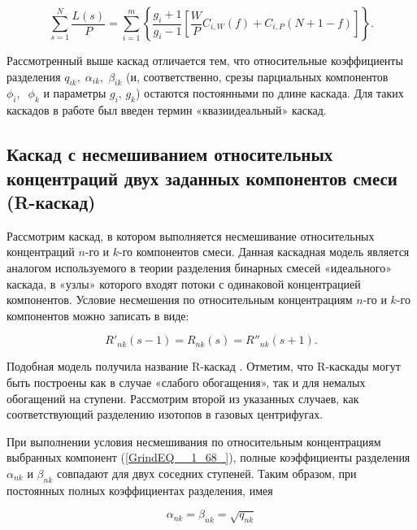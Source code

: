 \begin{equation} \label{GrindEQ__1_62_} 
  \sum _{s=1}^{N}\frac{L(s)}{P} =\sum _{i=1}^{m}\left\{\frac{g_{i} +1}{g_{i} -1} \left[\frac{W}{P} C_{i,W} (f)+C_{i,P} \left(N+1-f\right)\right]\right\}  .   
\end{equation} 
  
Рассмотренный выше каскад отличается тем, что относительные коэффициенты разделения $q_{ik} ,\; \alpha _{ik} ,\; \beta _{ik} $ (и, соответственно, срезы парциальных компонентов $\phi _{i} ,\; \; \phi _{k} $ и параметры $g_{i} $, $g_{k} $) остаются постоянными по длине каскада. Для таких каскадов в работе \cite{sazykinKvaziidealnyeKaskadyDlya2000} был введен термин «квазиидеальный» каскад.

\subsection{Каскад с несмешиванием относительных концентраций двух заданных компонентов смеси (R-каскад)}\label{R_cas}

Рассмотрим каскад, в котором выполняется несмешивание относительных концентраций $n$-го и $k$-го компонентов смеси. Данная каскадная модель является аналогом используемого в теории разделения бинарных смесей «идеального» каскада, в «узлы» которого входят потоки с одинаковой концентрацией компонентов. Условие несмешения по относительным концентрациям $n$-го и $k$-го компонентов можно записать в виде:

\begin{equation} \label{GrindEQ__1_68_} 
  R'_{nk} (s-1)=R_{nk} (s)=R''_{nk} (s+1).                                                 
\end{equation} 

Подобная модель получила название R-каскад \cite{sulaberidzeTeoriyaKaskadovDlya2011}. Отметим, что R-каскады могут быть построены как в случае «слабого обогащения», так и для немалых обогащений на ступени. Рассмотрим второй из указанных случаев, как соответствующий разделению изотопов в газовых центрифугах.

При выполнении условия несмешивания по относительным концентрациям выбранных компонент (\ref{GrindEQ__1_68_}), полные коэффициенты разделения $\alpha _{nk}$ и $\beta _{nk}$ совпадают для двух соседних ступеней. Таким образом, при постоянных полных коэффициентах разделения, имея

\begin{equation} \label{GrindEQ__1_69_} 
  \alpha _{nk} =\beta _{nk} =\sqrt{q_{nk} }  
\end{equation} 

